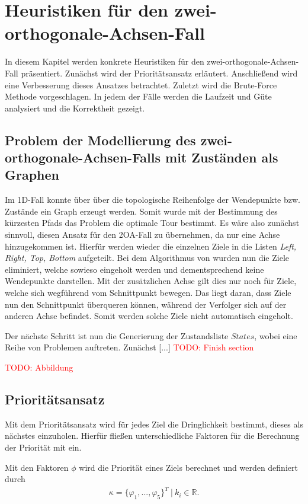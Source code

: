 \documentclass[german,version-2019-11]{uzl-thesis}
\begin{document}
\chapter{Heuristiken für den zwei-orthogonale-Achsen-Fall}

In diesem Kapitel werden konkrete Heuristiken für den zwei-orthogonale-Achsen-Fall präsentiert. Zunächst wird der Prioritätsansatz erläutert. Anschließend wird eine Verbesserung dieses Ansatzes betrachtet. Zuletzt wird die Brute-Force Methode vorgeschlagen. In jedem der Fälle werden die Laufzeit und Güte analysiert und die Korrektheit gezeigt.

\section{Problem der Modellierung des zwei-orthogonale-Achsen-Falls mit Zuständen als Graphen}
Im 1D-Fall konnte über über die topologische Reihenfolge der Wendepunkte bzw. Zustände ein Graph erzeugt werden. Somit wurde mit der Bestimmung des kürzesten Pfads das Problem die optimale Tour bestimmt. 
Es wäre also zunächst sinnvoll, diesen Ansatz für den 2OA-Fall zu übernehmen, da nur eine Achse hinzugekommen ist. Hierfür werden wieder die einzelnen Ziele in die Listen \emph{Left, Right, Top, Bottom} aufgeteilt. Bei dem Algorithmus von \cite{helvig} wurden nun die Ziele eliminiert, welche sowieso eingeholt werden und dementsprechend keine Wendepunkte darstellen. Mit der zusätzlichen Achse gilt dies nur noch für Ziele, welche sich wegführend vom Schnittpunkt bewegen. Das liegt daran, dass Ziele nun den Schnittpunkt überqueren können, während der Verfolger sich auf der anderen Achse befindet. Somit werden solche Ziele nicht automatisch eingeholt. 

Der nächste Schritt ist nun die Generierung der Zustandsliste $States$, wobei eine Reihe von Problemen auftreten. Zunächst [...]
\textcolor{red}{TODO: Finish section}

\textcolor{red}{TODO: Abbildung}
\newpage

\section{Prioritätsansatz}

Mit dem Prioritätsansatz wird für jedes Ziel die Dringlichkeit bestimmt, dieses als nächstes einzuholen. Hierfür fließen unterschiedliche Faktoren für die Berechnung der Priorität mit ein. 

\begin{definition}
Mit den Faktoren $\phi$ wird die Priorität eines Ziels berechnet und werden definiert durch
\begin{align*}
\kappa = \{\varphi_1,...,\varphi_5\}^T~|~k_i \in\mathbb{R}.
\end{align*}
\end{definition}
\end{document}
